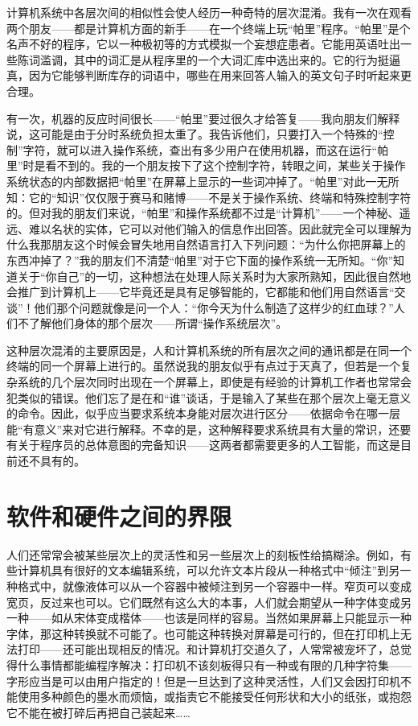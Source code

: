 计算机系统中各层次间的相似性会使人经历一种奇特的层次混淆。我有一次在观看两个朋友——都是计算机方面的新手——在一个终端上玩“帕里”程序。“帕里”是个名声不好的程序，它以一种极初等的方式模拟一个妄想症患者。它能用英语吐出一些陈词滥调，其中的词汇是从程序里的一个大词汇库中选出来的。它的行为挺逼真，因为它能够判断库存的词语中，哪些在用来回答人输入的英文句子时听起来更合理。

有一次，机器的反应时间很长——“帕里”要过很久才给答复——我向朋友们解释说，这可能是由于分时系统负担太重了。我告诉他们，只要打入一个特殊的“控制”字符，就可以进入操作系统，查出有多少用户在使用机器，而这在运行“帕里”时是看不到的。我的一个朋友按下了这个控制字符，转眼之间，某些关于操作系统状态的内部数据把“帕里”在屏幕上显示的一些词冲掉了。“帕里”对此一无所知：它的“知识”仅仅限于赛马和赌博——不是关于操作系统、终端和特殊控制字符的。但对我的朋友们来说，“帕里”和操作系统都不过是“计算机”——一个神秘、遥远、难以名状的实体，它可以对他们输入的信息作出回答。因此就完全可以理解为什么我那朋友这个时候会冒失地用自然语言打入下列问题：“为什么你把屏幕上的东西冲掉了？”我的朋友们不清楚“帕里”对于它下面的操作系统一无所知。“你”知道关于“你自己”的一切，这种想法在处理人际关系时为大家所熟知，因此很自然地会推广到计算机上——它毕竟还是具有足够智能的，它都能和他们用自然语言“交谈”！他们那个问题就像是问一个人：“你今天为什么制造了这样少的红血球？”人们不了解他们身体的那个层次——所谓“操作系统层次”。

这种层次混淆的主要原因是，人和计算机系统的所有层次之间的通讯都是在同一个终端的同一个屏幕上进行的。虽然说我的朋友似乎有点过于天真了，但若是一个复杂系统的几个层次同时出现在一个屏幕上，即使是有经验的计算机工作者也常常会犯类似的错误。他们忘了是在和“谁”谈话，于是输入了某些在那个层次上毫无意义的命令。因此，似乎应当要求系统本身能对层次进行区分——依据命令在哪一层能“有意义”来对它进行解释。不幸的是，这种解释要求系统具有大量的常识，还要有关于程序员的总体意图的完备知识——这两者都需要更多的人工智能，而这是目前还不具有的。

\section{软件和硬件之间的界限}

人们还常常会被某些层次上的灵活性和另一些层次上的刻板性给搞糊涂。例如，有些计算机具有很好的文本编辑系统，可以允许文本片段从一种格式中“倾注”到另一种格式中，就像液体可以从一个容器中被倾注到另一个容器中一样。窄页可以变成宽页，反过来也可以。它们既然有这么大的本事，人们就会期望从一种字体变成另一种——如从宋体变成楷体——也该是同样的容易。当然如果屏幕上只能显示一种字体，那这种转换就不可能了。也可能这种转换对屏幕是可行的，但在打印机上无法打印——还可能出现相反的情况。和计算机打交道久了，人常常被宠坏了，总觉得什么事情都能编程序解决：打印机不该刻板得只有一种或有限的几种字符集——字形应当是可以由用户指定的！但是一旦达到了这种灵活性，人们又会因打印机不能使用多种颜色的墨水而烦恼，或指责它不能接受任何形状和大小的纸张，或抱怨它不能在被打碎后再把自己装起来……

